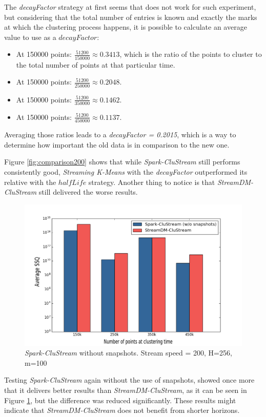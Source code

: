 The \textit{decayFactor} strategy at first seems that does not work for such experiment, but considering that the total number of entries is known and exactly the marks at which the clustering process happens, it is possible to calculate an average value to use as a $decayFactor$: 

\begin{itemize}
 \item At 150000 points: $\frac{51200}{150000} \approx 0.3413$, which is the ratio of the points to cluster to the total number of points at that particular time.
 \item At 150000 points: $\frac{51200}{250000} \approx 0.2048$.
 \item At 150000 points: $\frac{51200}{350000} \approx 0.1462$.
 \item At 150000 points: $\frac{51200}{450000} \approx 0.1137$.
\end{itemize}

Averaging those ratios leads to a \textit{decayFactor = 0.2015}, which is a way to determine how important the old data is in comparison to the new one.


Figure \ref{fig:comparison200} shows that while \textit{Spark-CluStream} still performs consistently good, \textit{Streaming K-Means} with the \textit{decayFactor} outperformed its relative with the $halfLife$ strategy. Another thing to notice is that \textit{StreamDM-CluStream} still delivered the worse results. 

\begin{figure}[h]
 \centering
 \includegraphics[scale=0.35]{./styles/comparisonNoSnaps2.png}
 \caption{\textit{Spark-CluStream} without snapshots. Stream speed = 200, H=256, m=100}
 \label{fig:comparisonNoSnaps2}
\end{figure}

Testing \textit{Spark-CluStream} again without the use of snapshots, showed once more that it delivers better results than \textit{StreamDM-CluStream}, as it can be seen in Figure \ref{fig:comparisonNoSnaps2}, but the difference was reduced significantly. These results might indicate that \textit{StreamDM-CluStream} does not benefit from shorter horizons.